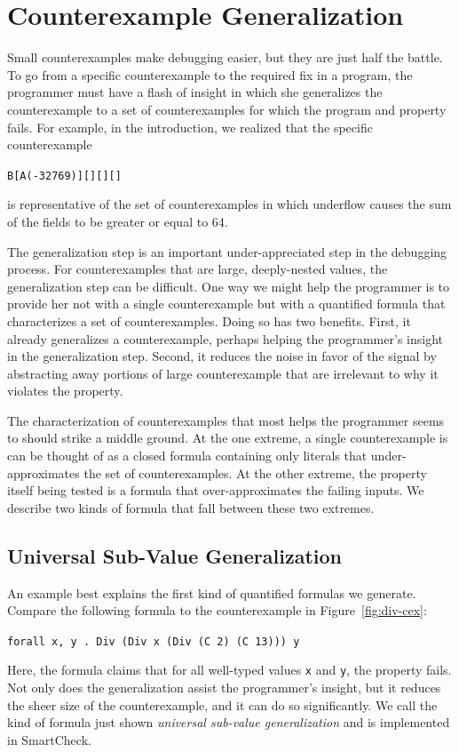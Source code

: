\documentclass[10pt]{sigplanconf}
\newenvironment{code}{\begin{alltt}}{\end{alltt}}
\newcommand{\ttp}[1]{\texttt{#1}}
\begin{document}
\section{Counterexample Generalization}\label{sec:generalization}

Small counterexamples make debugging easier, but they are just half the battle.
To go from a specific counterexample to the required fix in a program, the
programmer must have a flash of insight in which she generalizes the
counterexample to a set of counterexamples for which the program and property
fails.  For example, in the introduction, we realized that the specific
counterexample
%
\begin{code}
B [A (-32769)] [] [] []
\end{code}
%
\noindent
is representative of the set of counterexamples in which underflow causes the
sum of the fields to be greater or equal to 64.

The generalization step is an important under-appreciated step in the debugging
process.  For counterexamples that are large, deeply-nested values, the
generalization step can be difficult.  One way we might help the programmer is
to provide her not with a single counterexample but with a quantified formula
that characterizes a set of counterexamples.  Doing so has two benefits.  First,
it already generalizes a counterexample, perhaps helping the programmer's
insight in the generalization step.  Second, it reduces the noise in favor of
the signal by abstracting away portions of large counterexample that are
irrelevant to why it violates the property.

The characterization of counterexamples that most helps the programmer seems to
should strike a middle ground.  At the one extreme, a single counterexample is
can be thought of as a closed formula containing only literals that
under-approximates the set of counterexamples.  At the other extreme, the
property itself being tested is a formula that over-approximates the failing
inputs.  We describe two kinds of formula that fall between these two extremes.

\subsection{Universal Sub-Value Generalization}\label{sec:universal}
An example best explains the first kind of quantified formulas we generate.
Compare the following formula to the counterexample in Figure~\ref{fig:div-cex}:
%
\begin{code}
\ttp{forall x, y . Div (Div x (Div (C 2) (C 13))) y}
\end{code}
%
\noindent
Here, the formula claims that for all well-typed values \ttp{x} and \ttp{y}, the
property fails.  Not only does the generalization assist the programmer's
insight, but it reduces the sheer size of the counterexample, and it can do so
significantly.  We call the kind of formula just shown \emph{universal sub-value
  generalization} and is implemented in SmartCheck.
\end{document}
